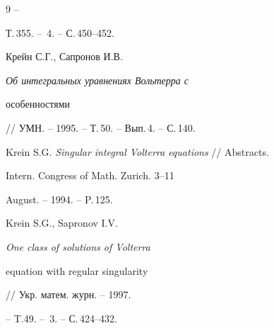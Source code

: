 \begin{thebibliography}{9}
-- 


Т.\,355. -- \No\,4. -- С.\,450--452. 




Крейн С.Г., Сапронов И.В. {\em Об интегральных уравнениях Вольтерра с 


особенностями} // УМН. -- 1995. -- Т.\,50. -- Вып.\,4. -- С.\,140. 




Krein S.G. {\em Singular integral Volterra equations} // Abstracts. 


Intern. Congress of Math. Zurich. 3--11 


August. -- 1994. -- P.\,125. 




Krein S.G., Sapronov I.V. {\em One class of solutions of Volterra 


equation with regular singularity} // Укр. матем. журн. -- 1997. 


-- T.49. -- \No\,3. -- С.\,424--432. 


 


\end{thebibliography} 


 


\vskip 2cm 


 






 


\label{end} 


 


